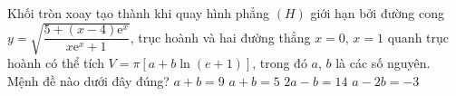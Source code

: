\begin{ex}%
	Khối tròn xoay tạo thành khi quay hình phẳng $ (H) $ giới hạn bởi đường cong $ y=\sqrt{\dfrac{5+(x-4)\mathrm{e}^x}{x\mathrm{e}^x+1}} $, trục hoành và hai đường thẳng $ x=0 $, $ x=1 $ quanh trục hoành có thể tích $ V=\pi[a+b\ln(e+1)] $, trong đó $ a $, $ b $ là các số nguyên. Mệnh đề nào dưới đây đúng?
	\choice
	{$ a+b=9 $}
	{$ a+b=5 $}
	{\True $ 2a-b=14 $}
	{$ a-2b=-3 $}
\end{ex}

